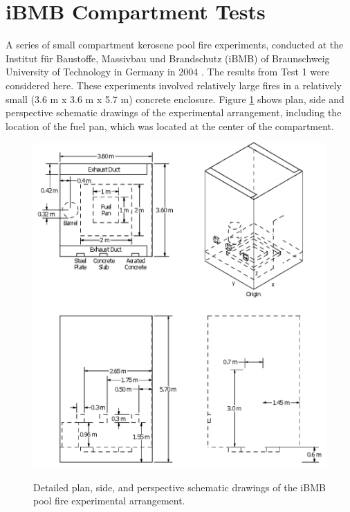 \section{iBMB Compartment Tests}

A series of small compartment kerosene pool fire experiments, conducted at the
Institut f\"ur Baustoffe, Massivbau und Brandschutz (iBMB) of Braunschweig University of
Technology in Germany in 2004 \cite{Klein-Helbetaling:2005}.  The results from Test 1 were
considered here.  These experiments involved relatively large fires in a relatively small (3.6 m x 3.6 m x 5.7 m) concrete enclosure. Figure  \ref{fig:iBMB_Pool_Detailed} shows plan, side and perspective schematic drawings
of the experimental arrangement, including the location of the fuel pan, which was located at the
center of the compartment.

\begin{figure}
\begin{center}
\includegraphics[width=6.5in]{FIGURES/iBMB/iBMB_Pool}\\
\end{center}
\caption{Detailed plan, side, and perspective schematic drawings of the iBMB pool fire experimental arrangement.}
 \label{fig:iBMB_Pool_Detailed}
\end{figure}
 
